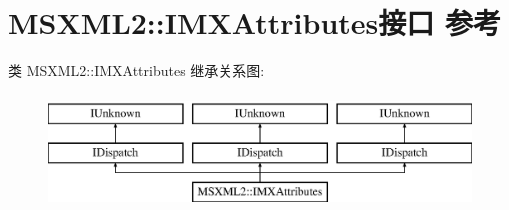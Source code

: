 \hypertarget{interface_m_s_x_m_l2_1_1_i_m_x_attributes}{}\section{M\+S\+X\+M\+L2\+:\+:I\+M\+X\+Attributes接口 参考}
\label{interface_m_s_x_m_l2_1_1_i_m_x_attributes}
类 M\+S\+X\+M\+L2\+:\+:I\+M\+X\+Attributes 继承关系图\+:\begin{figure}[H]
\begin{center}
\leavevmode
\includegraphics[height=3.000000cm]{interface_m_s_x_m_l2_1_1_i_m_x_attributes}
\end{center}
\end{figure}
